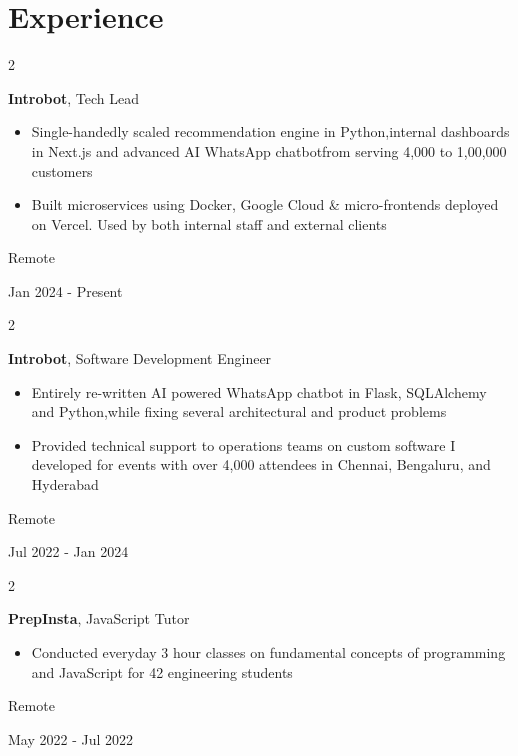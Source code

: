 \documentclass[10pt, letterpaper]{article}
\newenvironment{highlights}{
    \begin{itemize}[
        topsep=0.10 cm,
        parsep=0.10 cm,
        partopsep=0pt,
        itemsep=0pt,
        leftmargin=0.4 cm + 10pt
    ]
}{
    \end{itemize}
} %
\newenvironment{twocolentry}[2][]{
    \onecolentry
    \def\secondColumn{#2}
    \setcolumnwidth{\fill, 4.5 cm}
    \begin{paracol}{2}
}{
    \switchcolumn \raggedleft \secondColumn
    \end{paracol}
    \endonecolentry
} %
\begin{document}
    \section{Experience}
        \begin{twocolentry}{
            Remote

        Jan 2024 - Present
        }
            \textbf{Introbot}, Tech Lead
            \begin{highlights}
                \item Single-handedly scaled recommendation engine in Python,\newline internal dashboards in Next.js and advanced AI WhatsApp chatbot\newline from serving 4,000 to 1,00,000 customers
                \item Built microservices using Docker, Google Cloud \& micro-frontends deployed on Vercel. Used by both internal staff and external clients
            \end{highlights}
        \end{twocolentry}
        \vspace{0.2 cm}
        \begin{twocolentry}{
            Remote

        Jul 2022 - Jan 2024
        }
            \textbf{Introbot}, Software Development Engineer
            \begin{highlights}
                \item Entirely re-written AI powered WhatsApp chatbot in Flask, SQLAlchemy and Python,\newline while fixing several architectural and product problems
                \item Provided technical support to operations teams on custom software I developed for events with over 4,000 attendees in Chennai, Bengaluru, and Hyderabad
            \end{highlights}
        \end{twocolentry}
        \vspace{0.2 cm}
        \begin{twocolentry}{
            Remote

        May 2022 - Jul 2022
        }
            \textbf{PrepInsta}, JavaScript Tutor
            \begin{highlights}
                \item Conducted everyday 3 hour classes on fundamental concepts of programming and JavaScript for 42 engineering students
            \end{highlights}
        \end{twocolentry}
\end{document}
